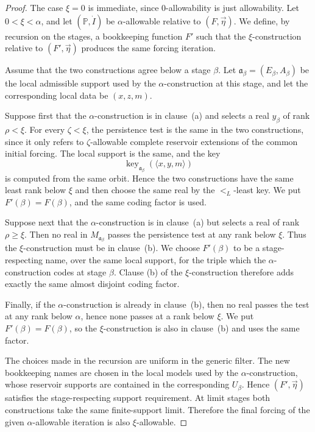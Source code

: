 \documentclass[a4paper,11pt]{article}
\newcommand{\forceP}{\mathbb{P}}
\newcommand{\key}{\operatorname{key}}
\begin{document}
\begin{proof}
The case $\xi=0$ is immediate, since $0$-allowability is just allowability.
Let $0<\xi<\alpha$, and let $(\forceP,\dot I)$ be $\alpha$-allowable
relative to $(F,\vec\eta)$.  We define, by recursion on the stages, a
bookkeeping function $F'$ such that the $\xi$-construction relative to
$(F',\vec\eta)$ produces the same forcing iteration.

Assume that the two constructions agree below a stage $\beta$.  Let
$\mathfrak a_\beta=(E_\beta,A_\beta)$ be the local admissible support used by
the $\alpha$-construction at this stage, and let the corresponding local data
be $(x,z,m)$.

Suppose first that the $\alpha$-construction is in clause~\textup{(a)} and
selects a real $y_\beta$ of rank $\rho<\xi$.  For every $\zeta<\xi$, the
persistence test is the same in the two constructions, since it only refers to
$\zeta$-allowable complete reservoir extensions of the common initial forcing.
The local support is the same, and the key
\[
   \key_{\mathfrak a_\beta}(\langle x,y,m\rangle)
\]
is computed from the same orbit.  Hence the two constructions have the same
least rank below $\xi$ and then choose the same real by the $<_L$-least key.
We put $F'(\beta)=F(\beta)$, and the same coding factor is used.

Suppose next that the $\alpha$-construction is in clause~\textup{(a)} but
selects a real of rank $\rho\geq\xi$.  Then no real in
$M_{\mathfrak a_\beta}$ passes the persistence test at any rank below $\xi$.
Thus the $\xi$-construction must be in clause~\textup{(b)}.  We choose
$F'(\beta)$ to be a stage-respecting name, over the same local support, for
the triple which the $\alpha$-construction codes at stage $\beta$.  Clause
\textup{(b)} of the $\xi$-construction therefore adds exactly the same almost
disjoint coding factor.

Finally, if the $\alpha$-construction is already in clause~\textup{(b)}, then
no real passes the test at any rank below $\alpha$, hence none passes at a
rank below $\xi$.  We put $F'(\beta)=F(\beta)$, so the $\xi$-construction is
also in clause~\textup{(b)} and uses the same factor.

The choices made in the recursion are uniform in the generic filter.  The new
bookkeeping names are chosen in the local models used by the
$\alpha$-construction, whose reservoir supports are contained in the
corresponding $U_\beta$.  Hence $(F',\vec\eta)$ satisfies the stage-respecting
support requirement.  At limit stages both constructions take the same
finite-support limit.  Therefore the final forcing of the given
$\alpha$-allowable iteration is also $\xi$-allowable.
\end{proof}
\end{document}
